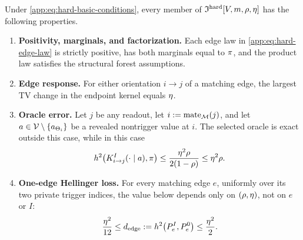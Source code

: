 \begin{lemma}
\label{app:lem:hard-local-facts}
Under \eqref{app:eq:hard-basic-conditions}, every member of
\(\mathfrak I^{\mathrm{hard}}[V,m,
\rho,\eta]\) has the following properties.
\begin{enumerate}
 \item \textup{\textbf{Positivity, marginals, and factorization.}}
 Each edge law in \eqref{app:eq:hard-edge-law} is strictly positive,
 has both marginals equal to \(\pi\), and the product law satisfies
 the structural forest assumptions.
 \item \textup{\textbf{Edge response.}}
 For either orientation \(i\to j\) of a matching edge, the largest TV
 change in the endpoint kernel equals \(\eta\).
 \item \textup{\textbf{Oracle error.}}
 Let $j$ be any readout, let $i:=\operatorname{mate}_{\mathcal M}(j)$, and let
 $a\in\mathcal V\setminus\{a_{\Theta_{i}}\}$ be a revealed
 nontrigger value at $i$.  The selected oracle is exact outside this case,
 while in this case
 \begin{equation}
  h^2\bigl(
   K_{i\to j}^{I}(\cdot\mid a),\pi
  \bigr)
  \le
  \frac{\eta^2\rho}
       {2(1-\rho)}
  \le \eta^2\rho.
  \label{app:eq:hard-local-oracle-error}
 \end{equation}
 \item \textup{\textbf{One-edge Hellinger loss.}}
 For every matching edge \(e\), uniformly over its two private trigger
 indices, the value below depends only on
 \((\rho,\eta)\), not on \(e\) or \(I\):
 \begin{equation}
  \frac{\eta^2}{12}
  \le
  d_{\mathrm{edge}}
  :=h^2\bigl(
     P_{e}^{I},P_{e}^{0}
    \bigr)
  \le\frac{\eta^2}{2}.
  \label{app:eq:hard-edge-distance}
 \end{equation}
\end{enumerate}
\end{lemma}

